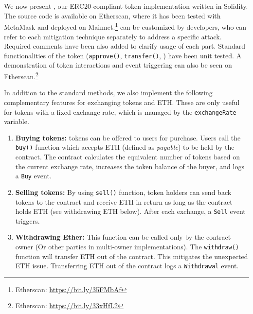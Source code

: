 
\section{\sys}\label{sec:proposal}

We now present \sys, our ERC20-compliant token implementation written in Solidity. The source code is available on Etherscan, where it has been tested with MetaMask and deployed on Mainnet.\footnote{Etherscan: \url{https://bit.ly/35FMbAf}} \sys can be customized by developers, who can refer to each mitigation technique separately to address a specific attack. Required comments have been also added to clarify usage of each part. Standard functionalities of the token (\ie \texttt{approve()}, \texttt{transfer()}, \etc) have been unit tested. A demonstration of token interactions and event triggering can also be seen on Etherscan.\footnote{Etherscan: \url{https://bit.ly/33xHfL2}} 


In addition to the standard \erc methods, we also implement the following complementary features for exchanging tokens and ETH. These are only useful for tokens with a fixed exchange rate, which is managed by the \texttt{exchangeRate} variable.  

\begin{enumerate}
	\item \textbf{Buying tokens:} \erc tokens can be offered to users for purchase. Users call the \texttt{buy()} function which accepts ETH (\ie defined as \textit{payable}) to be held by the \erc contract. The contract calculates the equivalent number of tokens based on the current exchange rate, increases the token balance of the buyer, and logs a \texttt{Buy} event.
	\item \textbf{Selling tokens:} By using \texttt{sell()} function, token holders can send back tokens to the contract and receive ETH in return as long as the contract holds ETH (see withdrawing ETH below). After each exchange, a \texttt{Sell} event triggers. 
	\item \textbf{Withdrawing Ether:} This function can be called only by the contract owner {\chg (Or other parties in multi-owner implementations)}. The \texttt{withdraw()} function will transfer ETH out of the contract. This mitigates the unexpected ETH issue. Transferring ETH out of the contract logs a \texttt{Withdrawal} event.
\end{enumerate}


